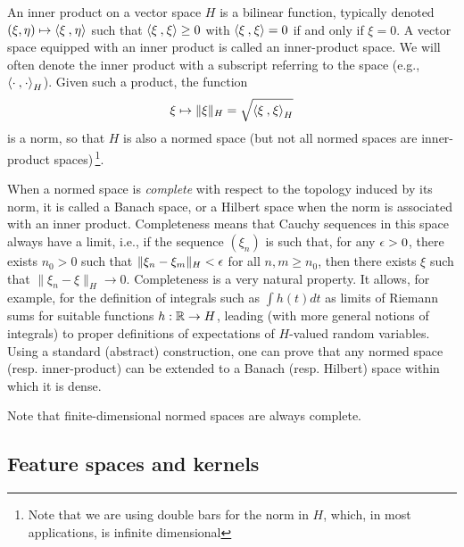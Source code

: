 An inner product on a vector space $H$ is a bilinear function, typically denoted $(\xi,\eta) \mapsto {\langle {\xi}\mathbin{,} {\eta}\rangle}$ such that ${\langle {\xi}\mathbin{,} {\xi}\rangle} \geq 0$ with ${\langle {\xi}\mathbin{,} {\xi}\rangle} = 0$ if and only if $\xi=0$. A vector space equipped with an inner product is called an inner-product space. We will often denote the inner product with a subscript referring to the space (e.g., ${\langle {\cdot}\mathbin{,} {\cdot}\rangle}_H$). Given such a product, the function
\[
\xi \mapsto \|\xi\|_H = \sqrt{{\langle {\xi}\mathbin{,} {\xi}\rangle}_H}
\]
is a norm, so that $H$ is also a normed space (but not all normed spaces are inner-product spaces)\,\footnote{Note that we are using double bars for the norm in $H$, which, in most applications, is infinite dimensional}.  

When a normed space is {\em complete} with respect to the topology induced by its norm, it is called a Banach space, or a Hilbert space when the norm is associated with an inner product. Completeness means that Cauchy sequences in this space always have a limit, i.e., if the sequence $(\xi_n)$ is such that, for any $\epsilon>0$, there exists $n_0>0$ such that $\|\xi_n-\xi_m\|_H < \epsilon$ for all $n,m\geq n_0$, then there exists $\xi$ such that $\|\xi_n - \xi\|_H \to 0$. Completeness is a very natural property. It allows, for example, for the definition of integrals such as $\int h(t) dt$ as limits of Riemann sums for suitable functions $h: {\mathbb{R}} \to H$, leading (with more general notions of integrals) to proper definitions of expectations of $H$-valued random variables. Using a standard (abstract) construction, one can prove that any normed space (resp. inner-product) can be extended to a Banach (resp. Hilbert) space within which it is dense. 

Note that finite-dimensional normed spaces are always complete.


\subsection{Feature spaces and kernels}

